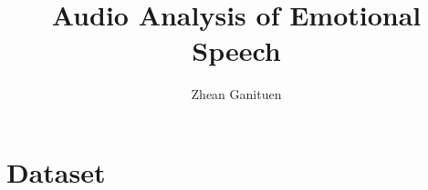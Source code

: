 \documentclass{article}
\title{Audio Analysis of Emotional Speech}
\author{Zhean Ganituen}
\begin{document}
\maketitle

\section{Dataset}
\end{document}
